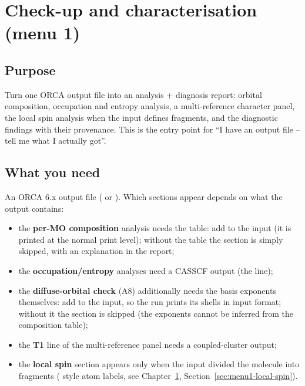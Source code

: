 \chapter{Check-up and characterisation (menu 1)}
\label{ch:menu1}

\section{Purpose}

Turn one ORCA output file into an analysis + diagnosis report: orbital
composition, occupation and entropy analysis, a multi-reference character
panel, the local spin analysis when the input defines fragments, and the
diagnostic findings with their provenance. This is the entry point for ``I have
an output file -- tell me what I actually got''.

\section{What you need}

An ORCA 6.x output file ( or ). Which sections appear
depends on what the output contains:

\begin{itemize}
  \item the \textbf{per-MO composition} analysis needs the
     table: add
     to the input (it is printed
    at the normal print level); without the table the section is simply
    skipped, with an explanation in the report;
  \item the \textbf{occupation/entropy} analyses need a CASSCF output (the
     line);
  \item the \textbf{diffuse-orbital check} (A8) additionally needs the basis
    exponents themselves: add  to the input, so the run prints
    its shells in input format; without it the section is skipped (the exponents
    cannot be inferred from the composition table);
  \item the \textbf{T1} line of the multi-reference panel needs a coupled-cluster
    output;
  \item the \textbf{local spin} section appears only when the input divided the
    molecule into fragments ( style atom labels, see
    Chapter~\ref{ch:menu1}, Section~\ref{sec:menu1-local-spin}).
\end{itemize}

